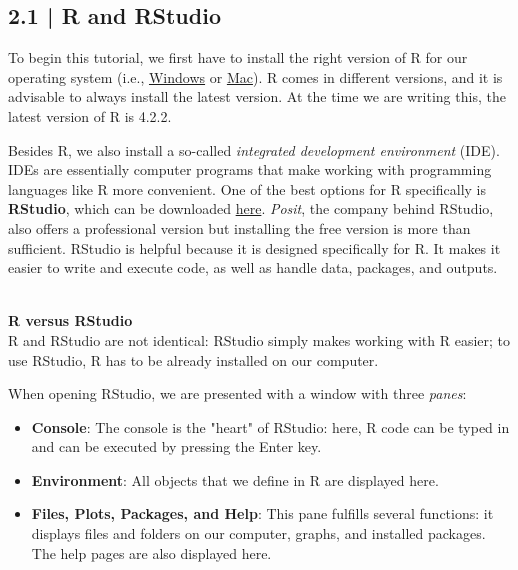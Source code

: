 \subsection{{\normalfont\textsf{\textcolor{sBlue}{\small 2.1 |}}} {\normalfont\textsf{R}} and RStudio}


To begin this tutorial, we first have to install the right version of \textsf{R} for our operating system (i.e., \href{https://cran.r-project.org/bin/windows/base/}{Windows} or \href{https://cran.r-project.org/bin/macosx/}{Mac}). \textsf{R} comes in different versions, and it is advisable to always install the latest version. At the time we are writing this, the latest version of \textsf{R} is 4.2.2.

Besides \textsf{R}, we also install a so-called \emph{integrated development environment} (IDE). IDEs are essentially computer programs that make working with programming languages like \textsf{R} more convenient. One of the best options for \textsf{R} specifically is \textbf{RStudio}, which can be downloaded \href{https://posit.co/products/open-source/rstudio/}{here}. \emph{Posit}, the company behind RStudio, also offers a professional version but installing the free version is more than sufficient. RStudio is helpful because it is designed specifically for \textsf{R}. It makes it easier to write and execute code, as well as handle data, packages, and outputs.

\begin{box-important} \\
\textcolor{burgundyred}{\textbf{\textsf{R} versus RStudio}} \\
\textsf{R} and RStudio are not identical: RStudio simply makes working with \textsf{R} easier; to use RStudio, \textsf{R} has to be already installed on our computer.
\end{box-important}

When opening RStudio, we are presented with a window with three \emph{panes}:

\begin{itemize}
    \item \textbf{Console}: The console is the "heart" of RStudio: here, \textsf{R} code can be typed in and can be executed by pressing the Enter key. 
    \item \textbf{Environment}: All objects that we define in \textsf{R} are displayed here.
    \item \textbf{Files, Plots, Packages, and Help}: This pane fulfills several functions: it displays files and folders on our computer, graphs, and installed packages. The help pages are also displayed here.
\end{itemize}

